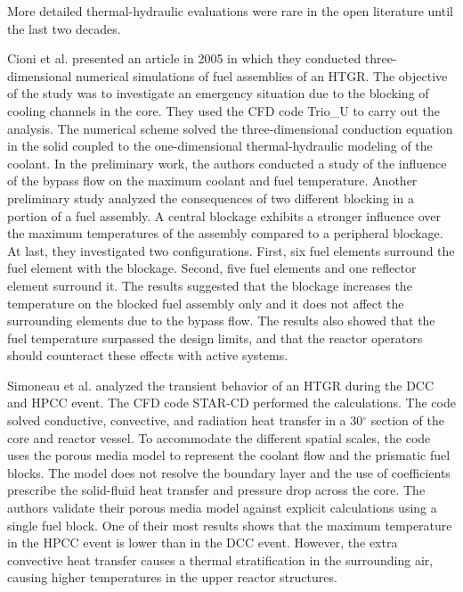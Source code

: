 \documentclass[11pt,letterpaper]{article}
\begin{document}
More detailed thermal-hydraulic evaluations were rare in the open literature until the last two decades.

Cioni et al. \cite{cioni_3d_2006} presented an article in 2005 in which they conducted three-dimensional numerical simulations of fuel assemblies of an \gls{HTGR}.
The objective of the study was to investigate an emergency situation due to the blocking of cooling channels in the core.
They used the \gls{CFD} code Trio_U \cite{bieder_priceles_2000} to carry out the analysis.
The numerical scheme solved the three-dimensional conduction equation in the solid coupled to the one-dimensional thermal-hydraulic modeling of the coolant.
In the preliminary work, the authors conducted a study of the influence of the bypass flow on the maximum coolant and fuel temperature.
Another preliminary study analyzed the consequences of two different blocking in a portion of a fuel assembly.
A central blockage exhibits a stronger influence over the maximum temperatures of the assembly compared to a peripheral blockage.
At last, they investigated two configurations.
First, six fuel elements surround the fuel element with the blockage.
Second, five fuel elements and one reflector element surround it.
The results suggested that the blockage increases the temperature on the blocked fuel assembly only and it does not affect the surrounding elements due to the bypass flow.
The results also showed that the fuel temperature surpassed the design limits, and that the reactor operators should counteract these effects with active systems.

Simoneau et al. \cite{simoneau_three-dimensional_2007} analyzed the transient behavior of an \gls{HTGR} during the \gls{DCC} and \gls{HPCC} event.
The CFD code STAR-CD \cite{computational_dynamics_limited_star-cd_2004} performed the calculations.
The code solved conductive, convective, and radiation heat transfer in a 30$^{\circ}$ section of the core and reactor vessel.
To accommodate the different spatial scales, the code uses the porous media model to represent the coolant flow and the prismatic fuel blocks.
The model does not resolve the boundary layer and the use of coefficients prescribe the solid-fluid heat transfer and pressure drop across the core.
The authors validate their porous media model against explicit calculations using a single fuel block.
One of their most results shows that the maximum temperature in the \gls{HPCC} event is lower than in the \gls{DCC} event.
However, the extra convective heat transfer causes a thermal stratification in the surrounding air, causing higher temperatures in the upper reactor structures.
\end{document}
